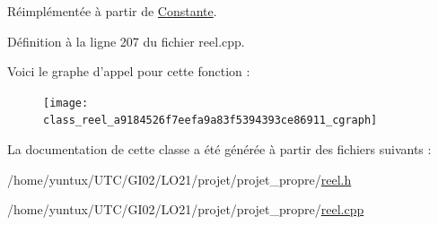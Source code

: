 \-Réimplémentée à partir de \hyperlink{class_constante_a6f5f971e61ac831355f1182289c3952f}{\-Constante}.



\-Définition à la ligne 207 du fichier reel.\-cpp.



\-Voici le graphe d'appel pour cette fonction \-:\nopagebreak
\begin{figure}[H]
\begin{center}
\leavevmode
\texttt{[image: class\_reel\_a9184526f7eefa9a83f5394393ce86911\_cgraph]}
\end{center}
\end{figure}




\-La documentation de cette classe a été générée à partir des fichiers suivants \-:\begin{DoxyCompactItemize}
\item 
/home/yuntux/\-U\-T\-C/\-G\-I02/\-L\-O21/projet/projet\-\_\-propre/\hyperlink{reel_8h}{reel.\-h}\item 
/home/yuntux/\-U\-T\-C/\-G\-I02/\-L\-O21/projet/projet\-\_\-propre/\hyperlink{reel_8cpp}{reel.\-cpp}\end{DoxyCompactItemize}
